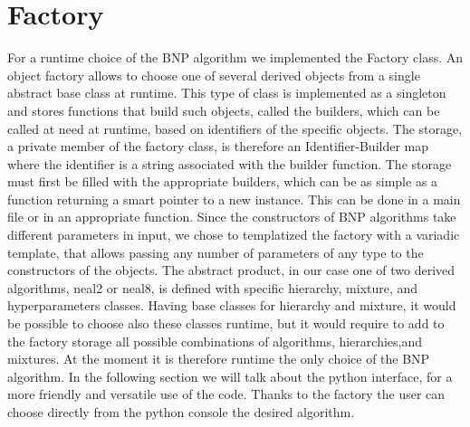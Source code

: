 \chapter{Factory}
For a runtime choice of the BNP algorithm we implemented the Factory class.
An object factory allows to choose one of several derived objects from a single abstract base class at runtime.  This type of class is implemented as a singleton and stores functions that build such objects, called the builders, which can be called at need at runtime, based on identifiers of the specific objects. The storage, a private member of the factory class, is therefore an Identifier-Builder map where the identifier is a string associated with the builder function.
 The storage must first be filled with the appropriate builders, which can be as simple as a function returning a smart pointer to a new instance. This can be done in a main file or in an appropriate function.
Since the constructors of BNP algorithms take different parameters in input, we chose to templatized the factory with a variadic template, that allows passing any number of parameters of any type to the constructors of the objects. 
The abstract product, in our case one of two derived algorithms, neal2 or neal8, is defined with specific hierarchy, mixture, and hyperparameters classes. Having base classes for hierarchy and mixture, it would be possible to choose also these classes runtime, but it would require to add to the factory storage all possible combinations of algorithms, hierarchies,and mixtures.
At the moment it is therefore runtime the only choice of the BNP algorithm.
In the following section we will talk about the python interface, for a more friendly and versatile use of the code. Thanks to the factory the user can choose directly from the python console the desired algorithm.
